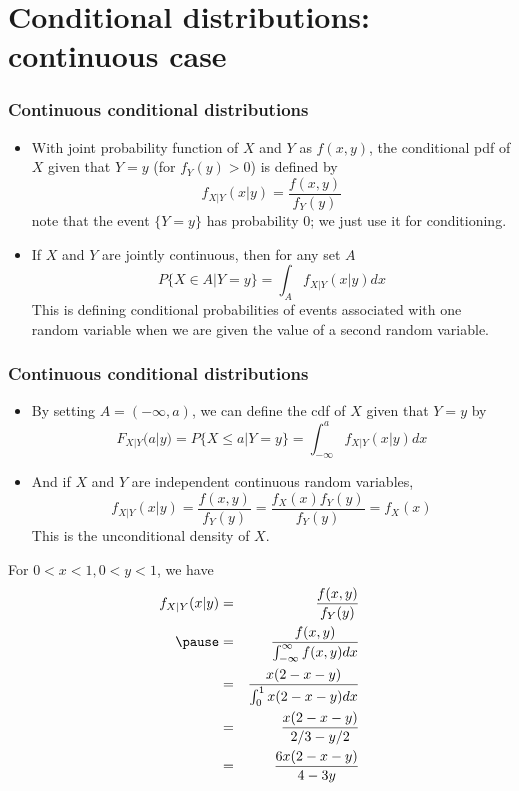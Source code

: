 \documentclass[slidestop,compress,mathserif]{beamer}
\begin{document}
\section{Conditional distributions: continuous case}


\begin{frame}\frametitle{Continuous conditional distributions}
\begin{itemize}
\item With joint probability function of $X$ and $Y$ as $f(x, y)$, the conditional pdf of $X$ given that $Y = y$ (for $f_Y(y) > 0$) is defined by
$$f_{X|Y}(x|y) = \frac{f(x, y)}{f_Y(y)}$$
note that the event $\{Y = y\}$ has probability $0$; we just use it for conditioning.
\pause
\item If $X$ and $Y$ are jointly continuous, then for any set $A$
$$P\{X \in A|Y = y\} = \int_A f_{X|Y}(x|y)dx$$
This is defining conditional probabilities of events associated with one random variable when we are given the value of a second random variable.
\end{itemize}
\end{frame}

\begin{frame}\frametitle{Continuous conditional distributions}
\begin{itemize}
\item By setting $A = (-\infty, a)$, we can define the cdf of $X$ given that $Y = y$ by
$$F_{X|Y}(a|y) = P\{X \leq a|Y = y\} = \int_{-\infty}^a f_{X|Y}(x|y)dx$$
\pause
\item And if $X$ and $Y$ are independent continuous random variables,
$$f_{X|Y}(x|y) = \frac{f(x, y)}{f_Y(y)} = \frac{f_X(x)f_Y(y)}{f_Y(y)} = f_X(x)$$
This is the unconditional density of $X$.
\end{itemize}
\end{frame}

\begin{frame}%
\pause
{\small{
For $0 < x < 1, 0 < y < 1$, we have
\begin{eqnarray*}
f_{X|Y}(x|y) &=& \frac{f(x, y)}{f_Y(y)}\\
\pause
&=&
\frac{f(x, y)}{\int_{-\infty}^{\infty}f(x, y)dx} \\
&=&
\frac{x(2 - x - y)}{\int_0^1x(2 - x - y)dx} \\
&=&
\frac{x(2 - x - y)}{2/3 - y/2} \\
&=&
\frac{6x(2 - x - y)}{4 - 3y}
\end{eqnarray*}
}}
\end{frame}
\end{document}
